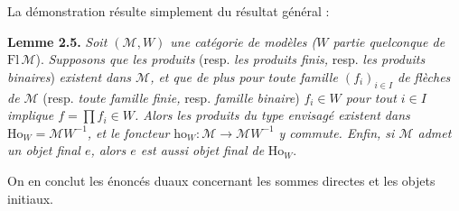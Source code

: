La démonstration résulte simplement du résultat général :

\textbf{Lemme 2.5.} \textit{Soit $(\mathcal{M}, W)$ une catégorie de modèles ($W$ partie quelconque de} $\mathrm{Fl}\,\mathcal{M}$). \textit{Supposons que les produits} (resp. \textit{les produits finis,} resp. \textit{les produits binaires}) \textit{existent dans $\mathcal{M}$, et que de plus pour toute famille $(f_i)_{i\in I}$ de flèches de $\mathcal{M}$} (resp. \textit{toute famille finie,}
resp. \textit{famille binaire}) \textit{$f_i \in W$ pour tout $i \in I$ implique $f = \prod f_i \in W$. Alors les produits du type envisagé existent dans} $\mathrm{Ho}_W = \mathcal{M}W^{-1}$\textit{, et le foncteur} $\mathrm{ho}_W : \mathcal{M} \longrightarrow \mathcal{M}W^{-1}$ \textit{y commute. Enfin, si $\mathcal{M}$ admet un objet final $e$, alors $e$ est aussi objet final de} $\mathrm{Ho}_W$.



On en conclut les énoncés duaux concernant les sommes directes et les objets initiaux.

